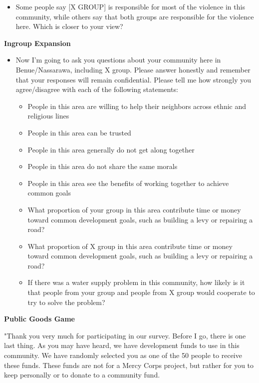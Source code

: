 \documentclass[11pt]{article}
\providecommand{\tightlist}{%
  \setlength{\itemsep}{0pt}\setlength{\parskip}{0pt}}
\begin{document}
\smallskip

\begin{itemize}
\tightlist
\item
  Some people say {[}X GROUP{]} is responsible for most of the violence
  in this community, while others say that both groups are responsible
  for the violence here. Which is closer to your view?
\end{itemize}

\textbf{Ingroup Expansion}

\begin{itemize}
\tightlist
\item
  Now I'm going to ask you questions about your community here in
  Benue/Nassarawa, including X group. Please answer honestly and
  remember that your responses will remain confidential. Please tell me
  how strongly you agree/disagree with each of the following statements:

  \begin{itemize}
  \tightlist
  \item
    People in this area are willing to help their neighbors across
    ethnic and religious lines
  \item
    People in this area can be trusted
  \item
    People in this area generally do not get along together
  \item
    People in this area do not share the same morals
  \item
    People in this area see the benefits of working together to achieve
    common goals
  \item
    What proportion of your group in this area contribute time or money
    toward common development goals, such as building a levy or
    repairing a road?
  \item
    What proportion of X group in this area contribute time or money
    toward common development goals, such as building a levy or
    repairing a road?
  \item
    If there was a water supply problem in this community, how likely is
    it that people from your group and people from X group would
    cooperate to try to solve the problem?
  \end{itemize}
\end{itemize}

\textbf{Public Goods Game}

"Thank you very much for participating in our survey. Before I go, there
is one last thing. As you may have heard, we have development funds to
use in this community. We have randomly selected you as one of the 50
people to receive these funds. These funds are not for a Mercy Corps
project, but rather for you to keep personally or to donate to a
community fund.
\end{document}
